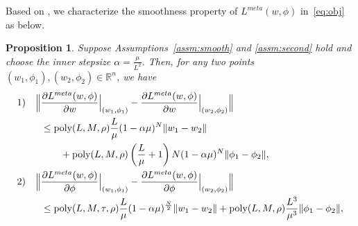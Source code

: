 \documentclass{osudissert96}
\newtheorem{proposition}{Proposition}
\begin{document}
Based on  , we characterize the smoothness property of $L^{meta}(w,\phi)$ in~\cref{eq:obj} as below. 
\begin{proposition}\label{le:strong-convex}
Suppose Assumptions~\ref{assm:smooth} and \ref{assm:second} hold
and choose the inner stepsize $\alpha=\frac{\mu}{L^2}$. Then, for any two points $(w_1,\phi_1), (w_2,\phi_2)\in\mathbb{R}^n$, we have
\begin{align*}
1)  \quad \Big\| &\frac{\partial L^{meta}( w,\phi)}{\partial w} \Big |_{(w_1,\phi_1)} - \frac{\partial L^{meta}( w,\phi)}{\partial w} \Big |_{(w_2,\phi_2)} \Big\| 
\\&\leq \text{\normalfont poly}(L,M,\rho)\frac{L}{\mu}(1-\alpha \mu)^{N}\|w_1-w_2\|
\\&\quad\quad+\text{\normalfont poly}(L,M,\rho)\left(\frac{L}{\mu}+1\right)N(1-\alpha \mu)^{N}\|\phi_1-\phi_2\|,
\\ 2)\quad  \Big\| &\frac{\partial L^{meta}( w,\phi)}{\partial \phi} \Big |_{(w_1,\phi_1)} -  \frac{\partial L^{meta}( w,\phi)}{\partial \phi} \Big |_{(w_2,\phi_2)} \Big\|
\\&\leq \text{\normalfont poly}(L,M,\tau,\rho) \frac{L}{\mu}(1-\alpha\mu)^{\frac{N}{2}}\|w_1-w_2\|+\text{\normalfont poly}(L,M,\rho) \frac{L^3}{\mu^3}\|\phi_1-\phi_2\|,

\end{align*}
\end{proposition}
\end{document}
